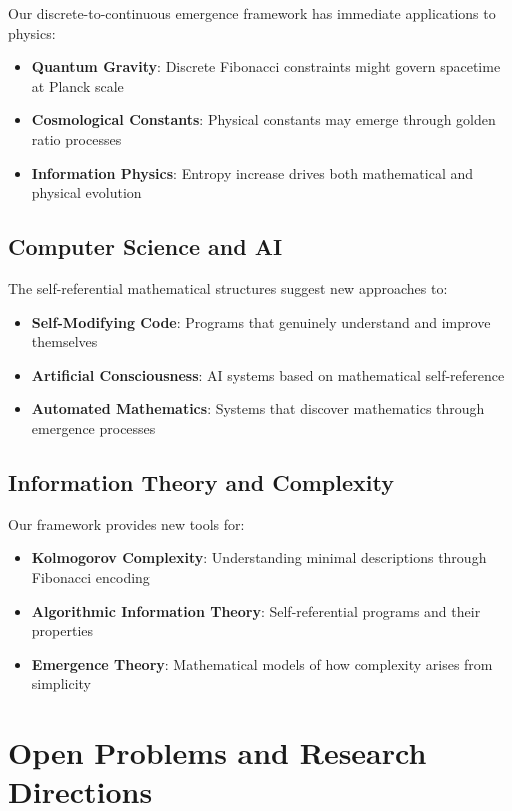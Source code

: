 \documentclass[12pt]{article}
\theoremstyle{plain}
\theoremstyle{definition}
\begin{document}
Our discrete-to-continuous emergence framework has immediate applications to physics:

\begin{itemize}
\item \textbf{Quantum Gravity}: Discrete Fibonacci constraints might govern spacetime at Planck scale
\item \textbf{Cosmological Constants}: Physical constants may emerge through golden ratio processes
\item \textbf{Information Physics}: Entropy increase drives both mathematical and physical evolution
\end{itemize}

\subsection{Computer Science and AI}

The self-referential mathematical structures suggest new approaches to:

\begin{itemize}
\item \textbf{Self-Modifying Code}: Programs that genuinely understand and improve themselves
\item \textbf{Artificial Consciousness}: AI systems based on mathematical self-reference
\item \textbf{Automated Mathematics}: Systems that discover mathematics through emergence processes
\end{itemize}

\subsection{Information Theory and Complexity}

Our framework provides new tools for:

\begin{itemize}
\item \textbf{Kolmogorov Complexity}: Understanding minimal descriptions through Fibonacci encoding
\item \textbf{Algorithmic Information Theory}: Self-referential programs and their properties
\item \textbf{Emergence Theory}: Mathematical models of how complexity arises from simplicity
\end{itemize}

\section{Open Problems and Research Directions}
\end{document}
